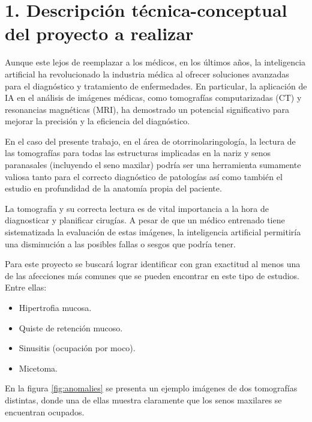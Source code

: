 \documentclass[
11pt, %
]{charter}
\begin{document}
\section{1. Descripción técnica-conceptual del proyecto a realizar}
\label{sec:descripcion}

Aunque este lejos de reemplazar a los médicos, en los últimos años, la inteligencia artificial 
ha revolucionado la industria médica al ofrecer soluciones avanzadas para el diagnóstico y 
tratamiento de enfermedades. En particular, la aplicación de IA en el análisis de imágenes 
médicas, como tomografías computarizadas (CT) y resonancias magnéticas (MRI), ha demostrado 
un potencial significativo para mejorar la precisión y la eficiencia del diagnóstico.

En el caso del presente trabajo, en el área de otorrinolaringología, la lectura de las 
tomografías para todas las estructuras implicadas en la nariz y senos paranasales 
(incluyendo el seno maxilar) podría ser una herramienta sumamente valiosa tanto para 
el correcto diagnóstico de patologías así como también el estudio en profundidad de la 
anatomía propia del paciente.

La tomografía y su correcta lectura es de vital importancia a la hora de diagnosticar y 
planificar cirugías. A pesar de que un médico entrenado tiene sistematizada la evaluación 
de estas imágenes, la inteligencia artificial permitiría una disminución a las posibles 
fallas o sesgos que podría tener.

Para este proyecto se buscará lograr identificar con gran exactitud al menos una de 
las afecciones más comunes que se pueden encontrar en este tipo de estudios. Entre ellas:

\begin{itemize}
	\item Hipertrofia mucosa.
	\item Quiste de retención mucoso.
	\item Sinusitis (ocupación por moco).
	\item Micetoma.
\end{itemize}

En la figura \ref{fig:anomalies} se presenta un ejemplo imágenes de dos tomografías distintas, 
donde una de ellas muestra claramente que los senos maxilares se encuentran ocupados. 
\end{document}
